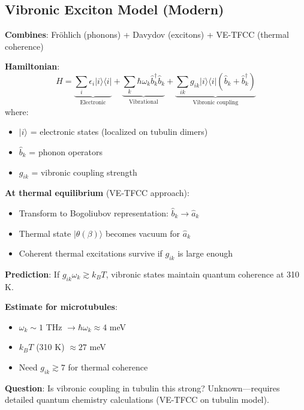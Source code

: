 \subsection{Vibronic Exciton Model (Modern)}\label{vibronic-exciton-model-modern}

\textbf{Combines}: Fröhlich (phonons) + Davydov (excitons) + VE-TFCC
(thermal coherence)

\textbf{Hamiltonian}:
\begin{equation}
\label{eq:vibronic-hamiltonian}
\hat{H} = \underbrace{\sum_i \epsilon_i | i \rangle \langle i |}_{\text{Electronic}} + \underbrace{\sum_k \hbar \omega_k \hat{b}_k^\dagger \hat{b}_k}_{\text{Vibrational}} + \underbrace{\sum_{ik} g_{ik} | i \rangle \langle i | (\hat{b}_k + \hat{b}_k^\dagger)}_{\text{Vibronic coupling}}
\end{equation}
where:
\begin{itemize}
\item $| i \rangle$ = electronic states (localized on tubulin dimers)
\item $\hat{b}_k$ = phonon operators
\item $g_{ik}$ = vibronic coupling strength
\end{itemize}

\textbf{At thermal equilibrium} (VE-TFCC approach):
\begin{itemize}
\item Transform to Bogoliubov representation: $\hat{b}_k \rightarrow \hat{a}_k$
\item Thermal state $|\theta(\beta)\rangle$ becomes vacuum for $\hat{a}_k$
\item Coherent thermal excitations survive if $g_{ik}$ is large enough
\end{itemize}

\textbf{Prediction}: If $g_{ik} \omega_k \gtrsim k_B T$, vibronic states maintain quantum coherence at 310 K.

\textbf{Estimate for microtubules}:
\begin{itemize}
\item $\omega_k \sim 1$ THz $\rightarrow \hbar \omega_k \approx 4$ meV
\item $k_B T$ (310 K) $\approx 27$ meV
\item Need $g_{ik} \gtrsim 7$ for thermal coherence
\end{itemize}

\textbf{Question}: Is vibronic coupling in tubulin this strong?
Unknown---requires detailed quantum chemistry calculations (VE-TFCC
on tubulin model).


